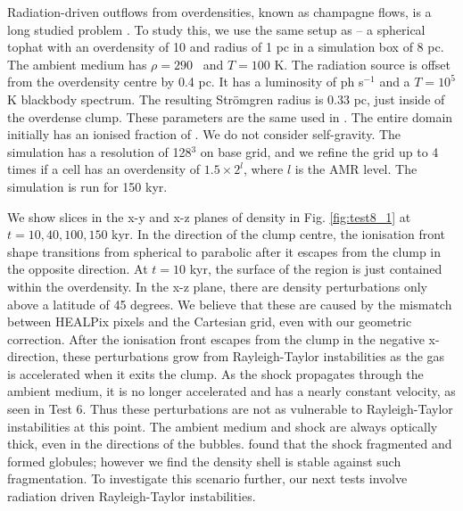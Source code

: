 \documentclass[useAMS,usenatbib]{mn2e}
\begin{document}
\begin{figure*}
  \caption{\label{fig:test8_1} Test 8. (Champagne flow from a dense
    clump).  Slices of density through the initial clump centre in the
    x-y plane (top) and x-z plane (bottom) at $t = 10, 40, 100, 150$
    kyr.  Notice the instabilities that grow from perturbations
    created while the \hii region is contained in the dense
    clump.}
\end{figure*}

Radiation-driven outflows from overdensities, known as champagne
flows, is a long studied problem \citep[e.g.][\S3.3]{Yorke86}.  To
study this, we use the same setup as \citet{Bisbas09} -- a spherical
tophat with an overdensity of 10 and radius of 1 pc in a simulation
box of 8 pc.  The ambient medium has $\rho = 290$ \cubecm~and $T =
100$ K.  The radiation source is offset from the overdensity centre by
0.4 pc.  It has a luminosity of  ph s$^{-1}$ and a $T=10^5$
K blackbody spectrum.  The resulting Str\"{o}mgren radius is 0.33 pc,
just inside of the overdense clump.  These parameters are the same
used in \citet{Bisbas09}.  The entire domain initially has an ionised
fraction of .  We do not consider self-gravity.  The
simulation has a resolution of 128$^3$ on base grid, and we refine the
grid up to 4 times if a cell has an overdensity of $1.5 \times 2^l$,
where $l$ is the AMR level.  The simulation is run for 150 kyr.

We show slices in the x-y and x-z planes of density in Fig.
\ref{fig:test8_1} at $t = 10, 40, 100, 150$ kyr.  In the direction of
the clump centre, the ionisation front shape transitions from
spherical to parabolic after it escapes from the clump in the opposite
direction.  At $t = 10$ kyr, the surface of the \hii region is
just contained within the overdensity.  In the x-z plane, there are
density perturbations only above a latitude of 45 degrees.  We believe
that these are caused by the mismatch between HEALPix pixels and the
Cartesian grid, even with our geometric correction.  After the
ionisation front escapes from the clump in the negative x-direction,
these perturbations grow from Rayleigh-Taylor instabilities as the gas
is accelerated when it exits the clump.  As the shock propagates
through the ambient medium, it is no longer accelerated and has a
nearly constant velocity, as seen in Test 6.  Thus these perturbations
are not as vulnerable to Rayleigh-Taylor instabilities at this point.
The ambient medium and shock are always optically thick, even in the
directions of the bubbles.  \citeauthor{Bisbas09} found that the shock
fragmented and formed globules; however we find the density shell is
stable against such fragmentation.  To investigate this scenario
further, our next tests involve radiation driven Rayleigh-Taylor
instabilities.
\end{document}
